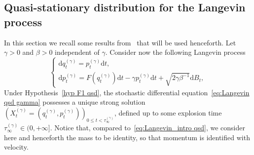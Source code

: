 \documentclass[preprint,EJP]{ejpecp}
\begin{document}
\subsection{Quasi-stationary distribution for the Langevin process}\label{sec:Lang}
In this section we recall some results from~\cite{LelRamRey2} that will be used henceforth. Let $\gamma>0$ and $\beta>0$ independent of $\gamma$. Consider now the following Langevin process
\begin{equation}\label{eq:Langevin qsd gamma}
  \left\{
    \begin{array}{ll}
        \mathrm{d}q^{(\gamma)}_t=p^{(\gamma)}_t \mathrm{d}t , \\
        \mathrm{d}p^{(\gamma)}_t=F(q^{(\gamma)}_t) \mathrm{d}t-\gamma  p^{(\gamma)}_t \mathrm{d}t+\sqrt{2\gamma\beta^{-1}}\mathrm{d}B_t,
    \end{array}
\right.  
\end{equation}
Under Hypothesis~\ref{hyp F1 qsd}, the stochastic differential equation~\eqref{eq:Langevin qsd gamma} possesses a unique strong solution $(X^{(\gamma)}_t=(q^{(\gamma)}_t,p^{(\gamma)}_t))_{0 \leq t < \tau^{(\gamma)}_\infty}$, defined up to some explosion time $\tau^{(\gamma)}_\infty \in (0,+\infty]$. Notice that, compared to~\eqref{eq:Langevin_intro qsd}, we
consider here and
  henceforth the mass to be identity, so that momentum is identified with velocity. 
 
\end{document}
